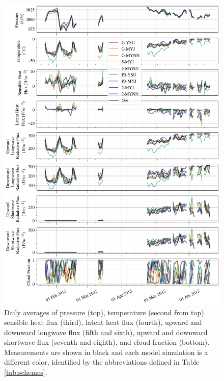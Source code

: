 \begin{figure}[p!]
    \centering
        \vspace*{-2.5cm}
    \includegraphics[width=1\linewidth]{figures/chapter3/WRF_totaltimeseries.png}
    \caption[Polar WRF simulated pressure, temperature, sensible and latent heat flux, components of longwave and shortwave flux, and cloud fraction time series.]{Daily averages of pressure (top), temperature (second from top) sensible heat flux (third), latent heat flux (fourth), upward and downward longwave flux (fifth and sixth), upward and downward shortwave flux (seventh and eighth), and cloud fraction (bottom). Measurements are shown in black and each model simulation is a different color, identified by the abbreviations defined in Table \ref{tab:schemes}.}
    \label{fig:wrf_all}
\end{figure}

